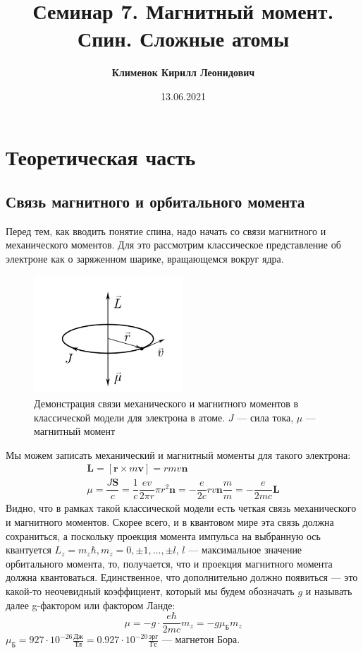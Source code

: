 \documentclass[12pt]{article}
\begin{document}
 
\title{\textbf{Семинар 7. Магнитный момент. Спин. Сложные атомы}}
\author{\textbf{Клименок Кирилл Леонидович}}
\date{13.06.2021}
\maketitle
\section{Теоретическая часть}

\subsection{Связь магнитного и орбитального момента}
Перед тем, как вводить понятие спина, надо начать со связи магнитного и механического моментов. Для это рассмотрим классическое представление об электроне как о заряженном шарике, вращающемся вокруг ядра.

\begin{figure}[h]
    \centering
    \includegraphics[width=0.5\textwidth,height=\textheight,keepaspectratio]{Seminar_07/pics/pic_01.PNG}
    \caption{Демонстрация связи механического и магнитного моментов в классической модели для электрона в атоме. $J$ --- сила тока, $\mu$ --- магнитный момент}
    \label{fig:sem_7_gymagnetic_ratio}
\end{figure}

\noindent
Мы можем записать механический и магнитный моменты для такого электрона:
\begin{gather*}
    \textbf{L} = [\textbf{r} \times m\textbf{v}] = rmv \textbf{n}\\
    \mu = \dfrac{J\textbf{S}}{c} = \dfrac{1}{c} \dfrac{ev}{2\pi r}\pi r^2 \textbf{n} = - \dfrac{e}{2c} rv\textbf{n} \dfrac{m}{m} = -\dfrac{e}{2mc}\textbf{L}
\end{gather*}
Видно, что в рамках такой классической модели есть четкая связь механического и магнитного моментов. Скорее всего, и в квантовом мире эта связь должна сохраниться, а поскольку проекция момента импульса на выбранную ось квантуется $L_z = m_z \hbar, m_z = 0, \pm 1, \dots, \pm l$, $l$ --- максимальное значение орбитального момента, то, получается, что и проекция магнитного момента должна квантоваться. Единственное, что дополнительно должно появиться --- это какой-то неочевидный коэффициент, который мы будем обозначать $g$ и называть далее g-фактором или фактором Ланде:
\begin{equation}
\mu = -g\cdot \dfrac{e\hbar}{2mc} m_z = -g \mu_{\text{Б}} m_z   
\end{equation}
$\mu_{\text{Б}} = 927 \cdot 10^{-26} \frac{\text{Дж}}{\text{Тл}} = 0.927 \cdot 10^{-20} \frac{\text{эрг}}{\text{Гс}}$ --- магнетон Бора.
\end{document}
